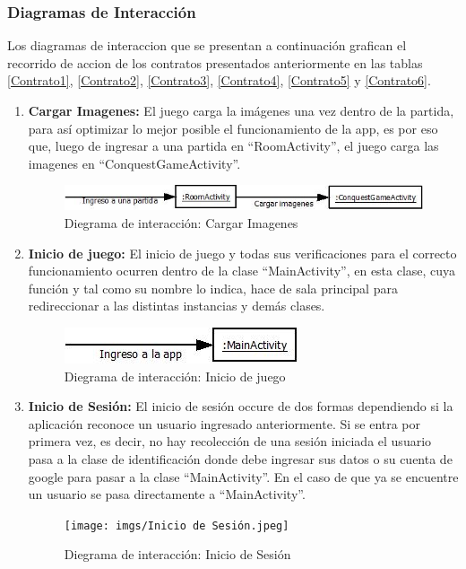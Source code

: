 \documentclass[12pt]{article}
\begin{document}
\subsubsection{Diagramas de Interacción}
Los diagramas de interaccion que se presentan a continuación grafican el recorrido de accion de los contratos presentados anteriormente en las tablas \ref{Contrato1}, \ref{Contrato2}, \ref{Contrato3}, \ref{Contrato4}, \ref{Contrato5} y \ref{Contrato6}.
\bigskip
\begin{enumerate}[1.]
	\item \textbf{Cargar Imagenes:}
El juego carga la imágenes una vez dentro de la partida, para así optimizar lo mejor posible el funcionamiento de la app, es por eso que, luego de ingresar a una partida en “RoomActivity”, el juego carga las imagenes en “ConquestGameActivity”.
	\begin{figure}[H]
		\centering
		\includegraphics[scale=1]{imgs/Cargar Imagenes.jpeg}
		\caption{Diegrama de interacción: Cargar Imagenes}
	\end{figure}

	\item \textbf{Inicio de juego:}
El inicio de juego y todas sus verificaciones para el correcto funcionamiento ocurren dentro de la clase “MainActivity”, en esta clase, cuya función y tal como su nombre lo indica, hace de sala principal para redireccionar a las distintas instancias y demás clases.

	\begin{figure}[H]
		\centering
		\includegraphics[scale=1]{imgs/Inicio de juego.jpeg}
		\caption{Diegrama de interacción: Inicio de juego}
	\end{figure}

	\item \textbf{Inicio de Sesión:}
El inicio de sesión occure de dos formas dependiendo si la aplicación reconoce un usuario ingresado anteriormente. Si se entra por primera vez, es decir, no hay recolección de una sesión iniciada el usuario pasa a la clase de identificación donde debe ingresar sus datos o su cuenta de google para pasar a la clase “MainActivity”. En el caso de que ya se encuentre un usuario se pasa directamente a “MainActivity”.
	\begin{figure}[H]
		\centering
		\texttt{[image: imgs/Inicio de Sesión.jpeg]}
		\caption{Diegrama de interacción: Inicio de Sesión}
	\end{figure}


\end{enumerate}
\end{document}
